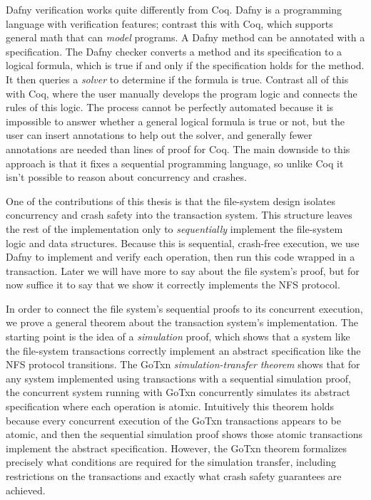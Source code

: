 Dafny verification works quite differently from Coq. Dafny is a programming
language with verification features; contrast this with Coq, which supports
general math that can \emph{model} programs. A Dafny method can be annotated
with a specification. The Dafny checker converts a method and its specification
to a logical formula, which is true if and only if the specification holds for
the method. It then queries a \emph{solver} to determine if the formula is true.
Contrast all of this with Coq, where the user manually develops the program
logic and connects the rules of this logic. The process cannot be perfectly
automated because it is impossible to answer whether a general logical formula
is true or not, but the user can insert annotations to help out the solver, and
generally fewer annotations are needed than lines of proof for Coq. The main
downside to this approach is that it fixes a sequential programming language, so
unlike Coq it isn't possible to reason about concurrency and crashes.

One of the contributions of this thesis is that the file-system design isolates
concurrency and crash safety into the transaction system. This structure leaves
the rest of the implementation only to \emph{sequentially} implement the
file-system logic and data structures. Because this is sequential, crash-free
execution, we use Dafny to implement and verify each operation, then run this
code wrapped in a transaction. Later we will have more to say about the file
system's proof, but for now suffice it to say that we show it correctly
implements the NFS protocol.

In order to connect the file system's sequential proofs to its concurrent
execution, we prove a general theorem about the transaction system's
implementation. The starting point is the idea of a \emph{simulation} proof,
which shows that a system like the file-system transactions correctly implement an
abstract specification like the NFS protocol transitions. The GoTxn
\emph{simulation-transfer theorem} shows that for any system implemented using
transactions with a sequential simulation proof, the concurrent system running
with GoTxn concurrently simulates its abstract specification where each
operation is atomic. Intuitively this theorem holds because every concurrent
execution of the GoTxn transactions appears to be atomic, and then the
sequential simulation proof shows those atomic transactions implement the
abstract specification. However, the GoTxn theorem formalizes precisely what
conditions are required for the simulation transfer, including restrictions on
the transactions and exactly what crash safety guarantees are achieved.

